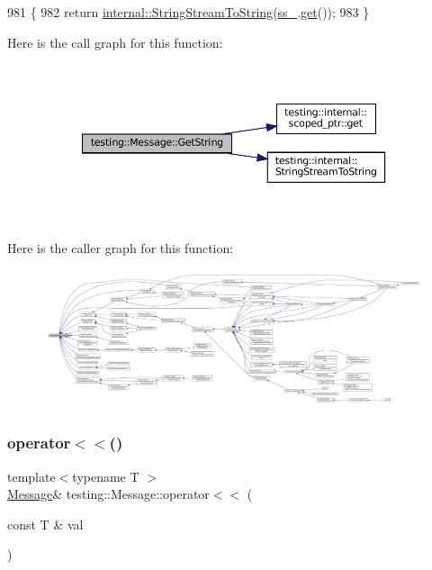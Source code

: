 \begin{DoxyCode}
981                                    \{
982   \textcolor{keywordflow}{return} \hyperlink{namespacetesting_1_1internal_ac0a2b7f69fc829d80a39e925b6417e39}{internal::StringStreamToString}(\hyperlink{classtesting_1_1Message_ad46fbddd62cde8526744ae32e3322b76}{ss\_}.\hyperlink{classtesting_1_1internal_1_1scoped__ptr_aa5984291e12453f1e81b7676d1fa26fd}{get}());
983 \}
\end{DoxyCode}
Here is the call graph for this function\+:
\nopagebreak
\begin{figure}[H]
\begin{center}
\leavevmode
\includegraphics[width=350pt]{classtesting_1_1Message_a2cdc4df62bdcc9df37651a1cf527704e_cgraph}
\end{center}
\end{figure}
Here is the caller graph for this function\+:
\nopagebreak
\begin{figure}[H]
\begin{center}
\leavevmode
\includegraphics[width=350pt]{classtesting_1_1Message_a2cdc4df62bdcc9df37651a1cf527704e_icgraph}
\end{center}
\end{figure}
\mbox{\label{classtesting_1_1Message_a2e0e71be52d54c20a75a55fca812721f}} 
\subsubsection{\texorpdfstring{operator$<$$<$()}{operator<<()}\hspace{0.1cm}{\footnotesize\ttfamily [1/6]}}
{\footnotesize\ttfamily template$<$typename T $>$ \\
\hyperlink{classtesting_1_1Message}{Message}\& testing\+::\+Message\+::operator$<$$<$ (\begin{DoxyParamCaption}\item[{const T \&}]{val }\end{DoxyParamCaption})\hspace{0.3cm}{\ttfamily [inline]}}



